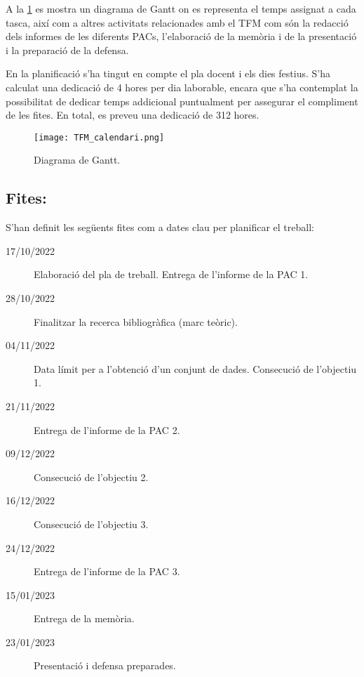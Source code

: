 \documentclass[CAT,BIB]{TFUOC}%
\begin{document}
            A la \cref{fig:gantt} es mostra un diagrama de Gantt on es representa el temps assignat a cada tasca, així com a altres activitats relacionades amb el TFM com són la redacció dels informes de les diferents PACs, l'elaboració de la memòria i de la presentació i la preparació de la defensa.

            En la planificació s'ha tingut en compte el pla docent i els dies festius. S'ha calculat una dedicació de 4 hores per dia laborable, encara que s'ha contemplat la possibilitat de dedicar temps addicional puntualment per assegurar el compliment de les fites. En total, es preveu una dedicació de 312 hores.

            \begin{figure}[htpb]
                \centering
                \texttt{[image: TFM\_calendari.png]}
                \caption{Diagrama de Gantt.}
                \label{fig:gantt}
            \end{figure}

        \subsection{Fites:}
        \label{sec:fites}

            S'han definit les següents fites com a dates clau per planificar el treball:

            \begin{description}
                \item[17/10/2022] Elaboració del pla de treball. Entrega de l'informe de la PAC 1.
                \item[28/10/2022] Finalitzar la recerca bibliogràfica (marc teòric).
                \item[04/11/2022] Data límit per a l'obtenció d'un conjunt de dades.
                Consecució de l'objectiu 1.
                \item[21/11/2022] Entrega de l'informe de la PAC 2.
                \item[09/12/2022] Consecució de l'objectiu 2.
                \item[16/12/2022] Consecució de l'objectiu 3.
                \item[24/12/2022] Entrega de l'informe de la PAC 3.
                \item[15/01/2023] Entrega de la memòria.
                \item[23/01/2023] Presentació i defensa preparades.
            \end{description}
\end{document}
